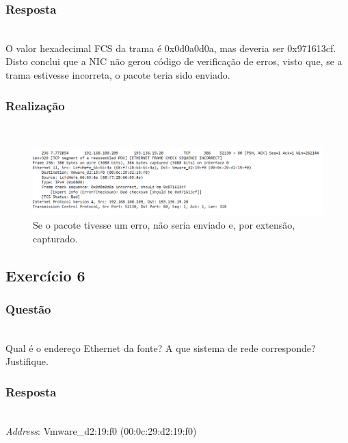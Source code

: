 \documentclass{llncs}
\begin{document}
\subsubsection{Resposta}\rule[-10pt]{0pt}{10pt}\\

O valor hexadecimal FCS da trama é 0x0d0a0d0a, mas deveria ser 0x971613cf. Disto conclui que a NIC não gerou código de verificação de erros, visto que, se a trama estivesse incorreta, o pacote teria sido enviado.

\subsubsection{Realização}\rule[-10pt]{0pt}{10pt}\\

\begin{figure}
  \begin{center}
  \includegraphics[scale=0.35]{imagens/FCS.png} 
  \end{center}
  \caption{Se o pacote tivesse um erro, não seria enviado e, por extensão, capturado.}
  \label{fig:fcs_field}
\end{figure} 

\clearpage
\subsection{Exercício 6}
\subsubsection{Questão}\rule[-10pt]{0pt}{10pt}\\

Qual é o endereço Ethernet da fonte? A que sistema de rede corresponde? Justifique.

\subsubsection{Resposta}\rule[-10pt]{0pt}{10pt}\\

\textit{Address}: Vmware\_d2:19:f0 (00:0c:29:d2:19:f0)
\end{document}
